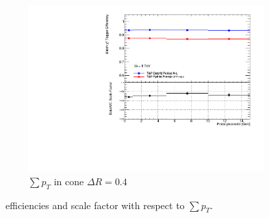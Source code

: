 \begin{figure}[phtb]
    \begin{subfigure}[b]{0.60\textwidth}
      \includegraphics[width=\textwidth]{PartCalibration2012/Plots/SFPlots/ptcone40_smt.pdf}
      \caption{$\sum p_{T}$ in cone $\Delta R=0.4$} \label{fig:CalibrationIsoPtcone40}
    \end{subfigure}
  \caption{\xsd\ efficiencies and scale factor with respect to $\sum p_{T}$.} \label{fig:CalibrationIsoPtcone}
\end{figure}

